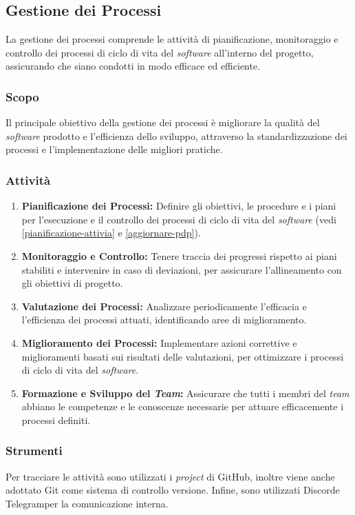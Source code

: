 \subsection{Gestione dei Processi}

La gestione dei processi comprende le attività di pianificazione, monitoraggio
e controllo dei processi di ciclo di vita del \textit{software} all'interno del
progetto, assicurando che siano condotti in modo efficace ed efficiente.

\subsubsection{Scopo}
Il principale obiettivo della gestione dei processi è migliorare la qualità
del \textit{software} prodotto e l'efficienza dello sviluppo, attraverso la
standardizzazione dei processi e l'implementazione delle migliori pratiche.

\subsubsection{Attività}
\begin{enumerate}
	\item \textbf{Pianificazione dei Processi:} Definire gli obiettivi, le
	      procedure e i piani per l'esecuzione e il controllo dei processi di
	      ciclo di vita del \textit{software} (vedi
	      \cref{pianificazione-attivia} e \cref{aggiornare-pdp}).
	\item \textbf{Monitoraggio e Controllo:} Tenere traccia dei progressi
	      rispetto ai piani stabiliti e intervenire in caso di deviazioni, per
	      assicurare l'allineamento con gli obiettivi di progetto.
	\item \textbf{Valutazione dei Processi:} Analizzare periodicamente
	      l'efficacia e l'efficienza dei processi attuati, identificando aree di
	      miglioramento.
	\item \textbf{Miglioramento dei Processi:} Implementare azioni correttive e
	      miglioramenti basati sui risultati delle valutazioni, per ottimizzare
	      i processi di ciclo di vita del \textit{software}.
	\item \textbf{Formazione e Sviluppo del \textit{Team}:} Assicurare che tutti i membri
	      del \textit{team} abbiano le competenze e le conoscenze necessarie per attuare
	      efficacemente i processi definiti.
\end{enumerate}

\subsubsection{Strumenti}
Per tracciare le attività sono utilizzati i \textit{project} di GitHub\g, inoltre
viene anche adottato Git come sistema di controllo versione. Infine, sono
utilizzati Discord\g e Telegram\g per la comunicazione interna.

